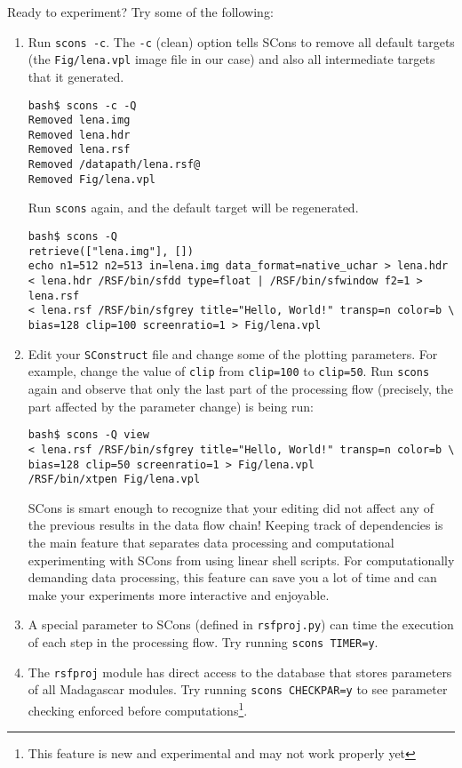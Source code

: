 Ready to experiment? Try some of the following:
\begin{enumerate}
\item Run \texttt{scons -c}. The \texttt{-c} (clean) option tells
  SCons to remove all default targets (the \texttt{Fig/lena.vpl} image
  file in our case) and also all intermediate targets that it generated. 
\begin{verbatim}
bash$ scons -c -Q
Removed lena.img
Removed lena.hdr
Removed lena.rsf
Removed /datapath/lena.rsf@
Removed Fig/lena.vpl
\end{verbatim}
Run \texttt{scons} again, and the default target will be regenerated.
\begin{verbatim}
bash$ scons -Q
retrieve(["lena.img"], [])
echo n1=512 n2=513 in=lena.img data_format=native_uchar > lena.hdr
< lena.hdr /RSF/bin/sfdd type=float | /RSF/bin/sfwindow f2=1 > lena.rsf
< lena.rsf /RSF/bin/sfgrey title="Hello, World!" transp=n color=b \
bias=128 clip=100 screenratio=1 > Fig/lena.vpl
\end{verbatim}
\item Edit your \texttt{SConstruct} file and change some of the
  plotting parameters. For example, change the value of \texttt{clip}
  from \texttt{clip=100} to \texttt{clip=50}. Run \texttt{scons} again
  and observe that only the last part of the processing flow
  (precisely, the part affected by the parameter change) is being run:
\begin{verbatim}
bash$ scons -Q view
< lena.rsf /RSF/bin/sfgrey title="Hello, World!" transp=n color=b \
bias=128 clip=50 screenratio=1 > Fig/lena.vpl
/RSF/bin/xtpen Fig/lena.vpl
\end{verbatim}
  SCons is smart enough to recognize that your editing did not affect
  any of the previous results in the data flow chain! Keeping track of
  dependencies is the main feature that separates data processing and
  computational experimenting with SCons from using linear shell
  scripts.  For computationally demanding data processing, this
  feature can save you a lot of time and can make your experiments
  more interactive and enjoyable.
\item A special parameter to SCons (defined in \texttt{rsfproj.py})
  can time the execution of each step in the processing flow. Try
  running \texttt{scons TIMER=y}.
\item The \texttt{rsfproj} module has direct access to the database
  that stores parameters of all Madagascar modules. Try running
  \texttt{scons CHECKPAR=y} to see parameter checking enforced before
  computations\footnote{This feature is new and experimental and may
    not work properly yet}.
\end{enumerate}

